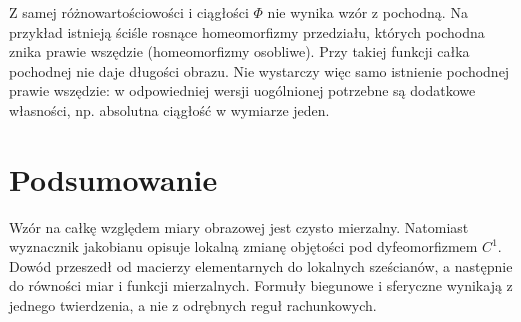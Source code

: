 \begin{przyklad}
Z samej różnowartościowości i ciągłości $\Phi$ nie wynika
wzór z pochodną. Na przykład istnieją ściśle rosnące
homeomorfizmy przedziału, których pochodna znika
prawie wszędzie (homeomorfizmy osobliwe).
Przy takiej funkcji całka pochodnej nie daje długości obrazu.
Nie wystarczy więc samo istnienie pochodnej prawie wszędzie:
w odpowiedniej wersji uogólnionej potrzebne są dodatkowe
własności, np. absolutna ciągłość w wymiarze jeden.
\end{przyklad}

\section{Podsumowanie}
Wzór na całkę względem miary obrazowej jest czysto
mierzalny. Natomiast wyznacznik jakobianu opisuje
lokalną zmianę objętości pod dyfeomorfizmem $C^1$.
Dowód przeszedł od macierzy elementarnych do lokalnych
sześcianów, a następnie do równości miar i funkcji
mierzalnych. Formuły biegunowe i sferyczne wynikają
z jednego twierdzenia, a nie z odrębnych reguł rachunkowych.
